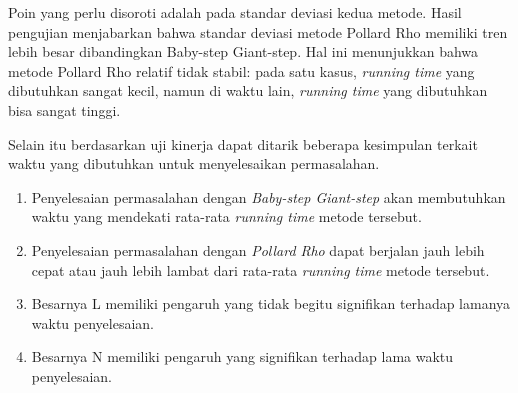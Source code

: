 Poin yang perlu disoroti adalah pada standar deviasi kedua metode. Hasil pengujian menjabarkan bahwa standar deviasi metode Pollard Rho memiliki tren lebih besar dibandingkan Baby-step Giant-step. Hal ini menunjukkan bahwa metode Pollard Rho relatif tidak stabil: pada satu kasus, \textit{running time} yang dibutuhkan sangat kecil, namun di waktu lain,\textit{ running time} yang dibutuhkan bisa sangat tinggi.

Selain itu berdasarkan uji kinerja dapat ditarik beberapa kesimpulan terkait waktu yang dibutuhkan untuk menyelesaikan permasalahan.

\begin{enumerate}
	\item Penyelesaian permasalahan dengan \textit{Baby-step Giant-step} akan membutuhkan waktu yang mendekati rata-rata \textit{running time} metode tersebut.
	\item Penyelesaian permasalahan dengan \textit{Pollard Rho} dapat berjalan jauh lebih cepat atau jauh lebih lambat dari rata-rata \textit{running time} metode tersebut.
	\item Besarnya L memiliki pengaruh yang tidak begitu signifikan terhadap lamanya waktu penyelesaian.
	\item Besarnya N memiliki pengaruh yang signifikan terhadap lama waktu penyelesaian.
\end{enumerate}